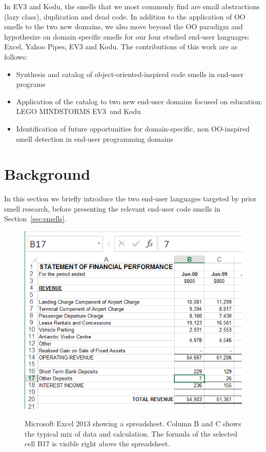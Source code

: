\documentclass{sig-alternate}
\newcommand{\ms}{LEGO MINDSTORMS EV3}
\begin{document}
In EV3 and Kodu, the smells that we most commonly find are small abstractions (lazy class), duplication and dead code. In addition to the application of OO smells to the two new domains, we also move beyond the OO paradigm and hypothesize on domain specific smells for our four studied end-user languages: Excel, Yahoo Pipes, EV3 and Kodu. The contributions of this work are as follows:

\begin{itemize}
	\item Synthesis and catalog of object-oriented-inspired code smells in end-user programs
	\item Application of the catalog to two new end-user domains focused on education: \ms~and Kodu
	\item Identification of future opportunities for domain-specific, non OO-inspired smell detection in end-user programming domains
\end{itemize}


\section{Background}
\label{sec:background}
In this section we briefly introduce the two end-user languages targeted by prior smell research, before presenting the relevant end-user code smells in Section~\ref{sec:smells}.



\begin{figure}
\caption{Microsoft Excel 2013 showing a spreadsheet. Column B and C shows the typical mix of data and calculation. The formula of the selected cell B17 is visible right above the spreadsheet.}
\centering
\includegraphics[width=\columnwidth]{img/excel-2}
\label{fig:spreadsheetexample}
\end{figure}
\end{document}
